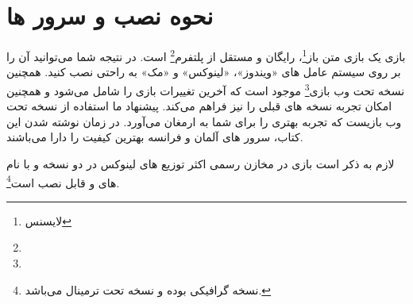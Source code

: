\chapter*{نحوه نصب و سرور ها}

بازی  یک بازی متن باز\footnote{لایسنس }، رایگان و مستقل از پلتفرم\footnote{} است.
در نتیجه شما می‌توانید آن را بر روی سیستم عامل های «ویندوز»، «لینوکس» و «مک» به راحتی نصب کنید.
همچنین نسخه تحت وب بازی\footnote{} موجود است که آخرین تغییرات بازی را شامل می‌شود و همچنین امکان تجربه نسخه های قبلی را نیز فراهم می‌کند. پیشنهاد ما  استفاده از نسخه تحت وب بازیست که تجربه بهتری را برای شما به ارمغان می‌آورد. در زمان نوشته شدن این کتاب، سرور های آلمان و فرانسه بهترین کیفیت را دارا می‌باشند.

لازم به ذکر است بازی در مخازن رسمی اکثر توزیع های لینوکس در دو نسخه  و  با نام های  و  قابل نصب است\footnote{نسخه  گرافیکی بوده و نسخه  تحت ترمینال می‌باشد.}.
